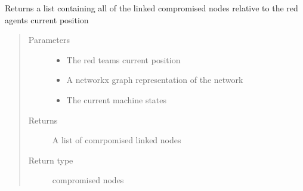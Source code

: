 \documentclass[letterpaper,10pt,english]{sphinxmanual}
\begin{document}
\begin{fulllineitems}
\label{\detokenize{source/yawning_titan.envs.specific.core:yawning_titan.envs.specific.core.node_states.get_linked_compromised_nodes}}
\sphinxAtStartPar
Returns a list containing all of the linked compromised nodes relative
to the red agents current position
\begin{quote}\begin{description}
\item[{Parameters}] \leavevmode\begin{itemize}
\item {}
\sphinxAtStartPar
{} \textendash{} The red teams current position

\item {}
\sphinxAtStartPar
{} \textendash{} A networkx graph representation of the network

\item {}
\sphinxAtStartPar
{} \textendash{} The current machine states

\end{itemize}

\item[{Returns}] \leavevmode
\sphinxAtStartPar
A list of comrpomised linked nodes

\item[{Return type}] \leavevmode
\sphinxAtStartPar
compromised nodes

\end{description}\end{quote}

\end{fulllineitems}

\end{document}

